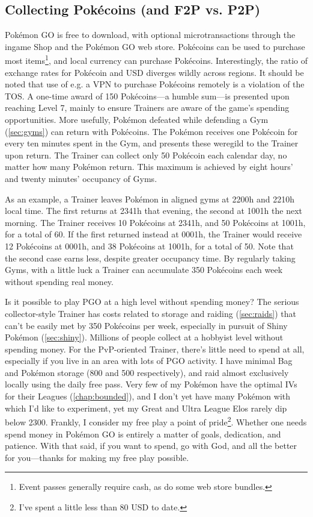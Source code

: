 \subsection{Collecting Pokécoins (and F2P vs. P2P)}
\label{subsec:getcoins}
Pokémon GO is free to download, with optional microtransactions through the ingame
  Shop and the Pokémon GO web store.
Pokécoins can be used to purchase most items\footnote{Event passes generally require cash,
  as do some web store bundles.}, and local currency can purchase Pokécoins.
Interestingly, the ratio of exchange rates for Pokécoin and USD diverges
  wildly across regions.
It should be noted that use of e.g. a VPN to purchase Pokécoins remotely is a
  violation of the TOS.
A one-time award of 150 Pokécoins---a humble sum---is presented upon reaching Level 7,
  mainly to ensure Trainers are aware of the game's spending opportunities.
More usefully, Pokémon defeated while defending a Gym (\autoref{sec:gyms}) can
  return with Pokécoins.
The Pokémon receives one Pokécoin for every ten minutes spent in the Gym,
  and presents these weregild to the Trainer upon return.
The Trainer can collect only 50 Pokécoin each calendar day, no matter how many Pokémon return.
This maximum is achieved by eight hours' and twenty minutes' occupancy of Gyms.

As an example, a Trainer leaves Pokémon in aligned gyms at 2200h and 2210h local time.
The first returns at 2341h that evening, the second at 1001h the next morning.
The Trainer receives 10 Pokécoins at 2341h, and 50 Pokécoins at 1001h, for a total of 60.
If the first returned instead at 0001h, the Trainer would receive 12 Pokécoins at 0001h,
  and 38 Pokécoins at 1001h, for a total of 50.
Note that the second case earns less, despite greater occupancy time.
By regularly taking Gyms, with a little luck a Trainer can accumulate 350 Pokécoins each week
  without spending real money.

Is it possible to play PGO at a high level without spending money?
The serious collector-style Trainer has costs related to storage and raiding (\autoref{sec:raids})
  that can't be easily met by 350 Pokécoins per week, especially
  in pursuit of Shiny Pokémon (\autoref{sec:shiny}).
Millions of people collect at a hobbyist level without spending money.
For the PvP-oriented Trainer, there's little need to spend at all,
  especially if you live in an area with lots of PGO activity.
I have minimal Bag and Pokémon storage (800 and 500 respectively), and raid almost exclusively locally using the daily free pass.
Very few of my Pokémon have the optimal IVs for their Leagues (\autoref{chap:bounded}),
  and I don't yet have many Pokémon with which I'd like to experiment,
  yet my Great and Ultra League Elos rarely dip below 2300.
Frankly, I consider my free play a point of pride\footnote{I've spent a little less than 80 USD to date.}.
Whether one needs spend money in Pokémon GO is entirely a matter of goals, dedication, and patience.
With that said, if you want to spend, go with God, and all the better for you---thanks for making my free play possible.


